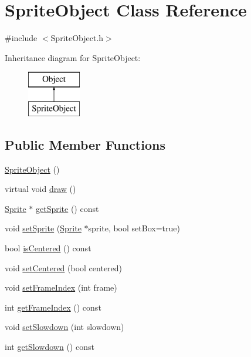 \hypertarget{class_sprite_object}{\section{Sprite\+Object Class Reference}
\label{class_sprite_object}
}


{\ttfamily \#include $<$Sprite\+Object.\+h$>$}

Inheritance diagram for Sprite\+Object\+:\begin{figure}[H]
\begin{center}
\leavevmode
\includegraphics[height=2.000000cm]{class_sprite_object}
\end{center}
\end{figure}
\subsection*{Public Member Functions}
\begin{DoxyCompactItemize}
\item 
\hyperlink{class_sprite_object_a2f087f058dc5fcbee302a8f55c20e056}{Sprite\+Object} ()
\item 
virtual void \hyperlink{class_sprite_object_ae847b803fc182b7ff0136d902b80819a}{draw} ()
\item 
\hyperlink{class_sprite}{Sprite} $\ast$ \hyperlink{class_sprite_object_a6e08d86800af64b64f418675ee6e453c}{get\+Sprite} () const 
\item 
void \hyperlink{class_sprite_object_a5898d37e753a73122c7b4364acd1586d}{set\+Sprite} (\hyperlink{class_sprite}{Sprite} $\ast$sprite, bool set\+Box=true)
\item 
bool \hyperlink{class_sprite_object_a945f4ca943003fc34b8bb36e42d77510}{is\+Centered} () const 
\item 
void \hyperlink{class_sprite_object_aa27b75d323d453069433dbaa39e5df85}{set\+Centered} (bool centered)
\item 
void \hyperlink{class_sprite_object_a2d43271a2ab04e28a358b7e13d8f9d17}{set\+Frame\+Index} (int frame)
\item 
int \hyperlink{class_sprite_object_a67fdbbec2ebbabe75274143e2d05c86b}{get\+Frame\+Index} () const 
\item 
void \hyperlink{class_sprite_object_a4a128cde5497bc293b301d9faeffe4f6}{set\+Slowdown} (int slowdown)
\item 
int \hyperlink{class_sprite_object_af815a869de3942821121c7c8369037b2}{get\+Slowdown} () const 
\end{DoxyCompactItemize}


